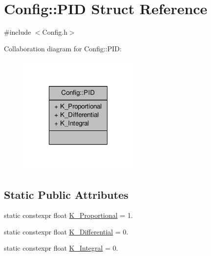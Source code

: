 \hypertarget{struct_config_1_1_p_i_d}{\section{Config\-:\-:P\-I\-D Struct Reference}
\label{struct_config_1_1_p_i_d}
}


{\ttfamily \#include $<$Config.\-h$>$}



Collaboration diagram for Config\-:\-:P\-I\-D\-:
\nopagebreak
\begin{figure}[H]
\begin{center}
\leavevmode
\includegraphics[width=168pt]{struct_config_1_1_p_i_d__coll__graph}
\end{center}
\end{figure}
\subsection*{Static Public Attributes}
\begin{DoxyCompactItemize}
\item 
static constexpr float \hyperlink{struct_config_1_1_p_i_d_a16541f93ad6c39ab64df5c9798659ddf}{K\-\_\-\-Proportional} = 1.
\item 
static constexpr float \hyperlink{struct_config_1_1_p_i_d_a074a795dbdbe8ac96de73a8a1c286b52}{K\-\_\-\-Differential} = 0.
\item 
static constexpr float \hyperlink{struct_config_1_1_p_i_d_afbfd3025b20357a0e6f41004024bc8ed}{K\-\_\-\-Integral} = 0.
\end{DoxyCompactItemize}


